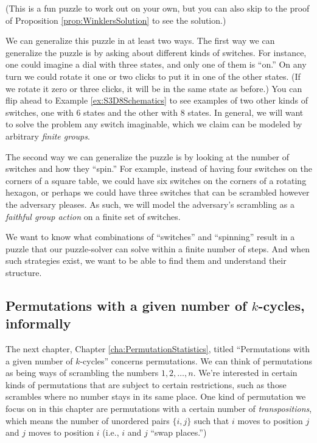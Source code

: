 (This is a fun puzzle to work out on your own, but you can also skip to
the proof of Proposition \ref{prop:WinklersSolution} to see the solution.)

We can generalize this puzzle in at least two ways.
The first way we can generalize the puzzle is by asking about different kinds of
switches. For instance, one could imagine a dial with three states,
and only one of them is ``on.''
On any turn we could rotate it one or two
clicks to put it in one of the other states.
(If we rotate it zero or three clicks, it will be in the same state as before.)
You can flip ahead to Example \ref{ex:S3D8Schematics} to see examples of two
other kinds of switches, one with $6$ states and the other with $8$ states.
In general, we will want to solve the problem any switch imaginable, which
we claim can be modeled by arbitrary \textit{finite groups}.

The second way we can generalize the puzzle is by looking at the number of
switches and how they ``spin.''
For example, instead of having four switches on the corners of a square table,
we could have six switches on the corners of a rotating hexagon, or perhaps
we could have three switches that can be scrambled however the adversary pleases.
As such, we will model the adversary's scrambling as a
\textit{faithful group action} on a finite set of switches.

We want to know what combinations of ``switches'' and ``spinning''
result in a puzzle that our puzzle-solver can solve within a finite number of
steps. And when such strategies exist, we want to be able to find them and
understand their structure.

\subsection{Permutations with a given number of \texorpdfstring{$k$}{k}-cycles, informally}
The next chapter, Chapter \ref{cha:PermutationStatistics}, titled
``Permutations with a given number of $k$-cycles''
concerns permutations.
We can think of permutations as being ways of scrambling the numbers
$1, 2, \dots, n$.
We're interested in certain kinds of permutations that are subject to certain
restrictions, such as those scrambles where no number stays in its same place.
One kind of permutation we focus on in this chapter are permutations with
a certain number of \textit{transpositions}, which means the number of unordered
pairs $\{i, j\}$ such that $i$ moves to position $j$ and $j$ moves to position $i$
(i.e., $i$ and $j$ ``swap places.'')

